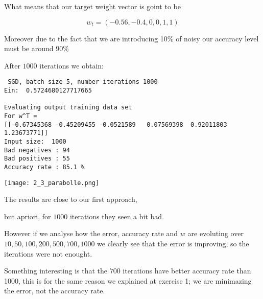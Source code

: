                  What means that our target weight vector is goint to be

                 $$w_t = (-0.56, -0.4, 0,0,1,1)$$

                 Moreover due to the fact that we are introducing 10\% of noisy our accuracy level must be around $90\%$

                After $1000$ iterations we obtain:

 \begin{verbatim}
 SGD, batch size 5, number iterations 1000
Ein:  0.5724680127717665

Evaluating output training data set
For w^T = 
[[-0.67345368 -0.45209455 -0.0521589   0.07569398  0.92011803  1.23673771]]
Input size:  1000
Bad negatives : 94
Bad positives : 55
Accuracy rate : 85.1 %

\end{verbatim}

                \texttt{[image: 2\_3\_parabolle.png]}

                
                
                The results are close to our first approach,
                
                but apriori, for $1000$ iterations they seen a bit bad.

                However if we analyse how the error, accuracy rate and $w$ are evoluting over $10, 50, 100, 200, 500, 700, 1000$ we clearly see that the error is improving, so the iterations were not enought.

                Something interesting is that the $700$ iterations have better accuracy rate than 1000, this is for the same reason we explained at exercise 1; we are minimazing the error, not the accuracy rate.    
       

